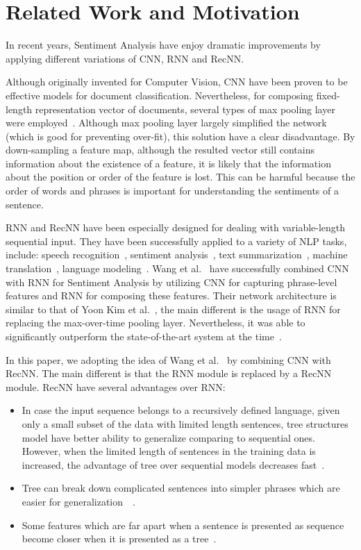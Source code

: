 \section{Related Work and Motivation}\label{sec:related}
In recent years, Sentiment Analysis have enjoy dramatic improvements by applying different variations of CNN, RNN and RecNN.

Although originally invented for Computer Vision, CNN have been proven to be effective models for document classification.
Nevertheless, for composing fixed-length representation vector of documents, several types of max pooling layer were employed~\cite{nlp-scratch, KimCNN, DCNN, 2-layer-cnn}.
Although max pooling layer largely simplified the network (which is good for preventing over-fit), this solution have a clear disadvantage.
By down-sampling a feature map, although the resulted vector still contains information about the existence of a feature, it is likely that the information about the position or order of the feature is lost.
This can be harmful because the order of words and phrases is important for understanding the sentiments of a sentence.

RNN and RecNN have been especially designed for dealing with variable-length sequential input.
They have been successfully applied to a variety of NLP tasks, include: speech recognition~\cite{speech-lstm, MiaoGM15}, sentiment analysis~\cite{treeLSTM, attention-gru}, text summarization~\cite{RushCW15, NallapatiXZ16}, machine translation~\cite{FiratCB16, SutskeverVL14, BritzGLL17}, language modeling~\cite{mikolov-nlm, JozefowiczVSSW16}.
Wang et al.~\cite{cnn-rnn} have successfully combined CNN with RNN for Sentiment Analysis by utilizing CNN for capturing phrase-level features and RNN for composing these features.
Their network architecture is similar to that of Yoon Kim et al.~\cite{KimCNN}, the main different is the usage of RNN for replacing the max-over-time pooling layer.
Nevertheless, it was able to significantly outperform the state-of-the-art system at the time~\cite{cnn-rnn}.

In this paper, we adopting the idea of Wang et al.~\cite{cnn-rnn} by combining CNN with RecNN.
The main different is that the RNN module is replaced by a RecNN module.
RecNN have several advantages over RNN:
\begin{itemize}
	\item In case the input sequence belongs to a recursively defined language, given only a small subset of the data with limited length sentences, tree structures model have better ability to generalize comparing to sequential ones.
	However, when the limited length of sentences in the training data is increased, the advantage of tree over sequential models decreases fast~\cite{bowman-treevslstm}.
	\item Tree can break down complicated sentences into simpler phrases which are easier for generalization~\cite{knowledge-matter}~\cite{need-tree}.
	\item Some features which are far apart when a sentence is presented as sequence become closer when it is presented as a tree~\cite{need-tree}.
\end{itemize}


